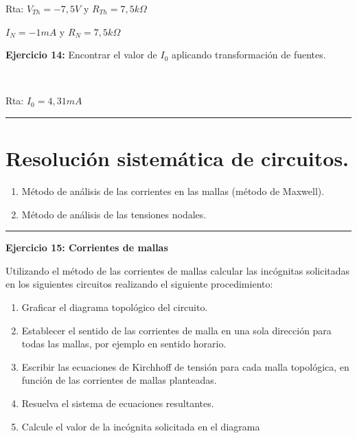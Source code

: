 \documentclass[11pt]{article}
\providecommand{\tightlist}{%
      \setlength{\itemsep}{0pt}\setlength{\parskip}{0pt}}
\begin{document}
    Rta: \(V_{Th}=-7,5V\) y \(R_{Th}=7,5k\Omega\)

\(I_{N}=-1mA\) y \(R_{N}=7,5k\Omega\)

\textbf{Ejercicio 14:} Encontrar el valor de \(I_{0}\) aplicando
transformación de fuentes.

    \begin{center}
    \end{center}
    { \hspace*{\fill} \\}
    
    Rta: \(I_0=4,31mA\)

    \begin{center}\rule{0.5\linewidth}{0.5pt}\end{center}

\hypertarget{resoluciuxf3n-sistemuxe1tica-de-circuitos.}{%
\section{Resolución sistemática de
circuitos.}\label{resoluciuxf3n-sistemuxe1tica-de-circuitos.}}

\begin{enumerate}
\def\labelenumi{\arabic{enumi}.}
\tightlist
\item
  Método de análisis de las corrientes en las mallas (método de
  Maxwell).
\item
  Método de análisis de las tensiones nodales.
\end{enumerate}

\begin{center}\rule{0.5\linewidth}{0.5pt}\end{center}

    \textbf{Ejercicio 15: Corrientes de mallas}

Utilizando el método de las corrientes de mallas calcular las incógnitas
solicitadas en los siguientes circuitos realizando el siguiente
procedimiento:

\begin{enumerate}
\def\labelenumi{\alph{enumi})}
\item
  Graficar el diagrama topológico del circuito.
\item
  Establecer el sentido de las corrientes de malla en una sola dirección
  para todas las mallas, por ejemplo en sentido horario.
\item
  Escribir las ecuaciones de Kirchhoff de tensión para cada malla
  topológica, en función de las corrientes de mallas planteadas.
\item
  Resuelva el sistema de ecuaciones resultantes.
\item
  Calcule el valor de la incógnita solicitada en el diagrama
\end{enumerate}
\end{document}
